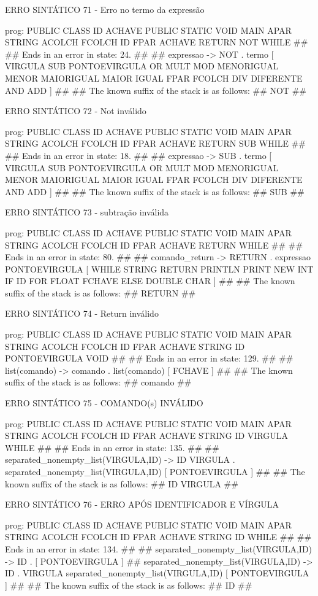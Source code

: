 \documentclass[12pt,a4paper,twoside]{report}
\begin{document}
\begin{terminal}
{ERRO SINTÁTICO 71 - Erro no termo da expressão

prog: PUBLIC CLASS ID ACHAVE PUBLIC STATIC VOID MAIN APAR STRING ACOLCH FCOLCH ID FPAR ACHAVE RETURN NOT WHILE 
##
## Ends in an error in state: 24.
##
## expressao -> NOT . termo [ VIRGULA SUB PONTOEVIRGULA OR MULT MOD MENORIGUAL MENOR MAIORIGUAL MAIOR IGUAL FPAR FCOLCH DIV DIFERENTE AND ADD ]
##
## The known suffix of the stack is as follows:
## NOT 
##

ERRO SINTÁTICO 72 - Not inválido

prog: PUBLIC CLASS ID ACHAVE PUBLIC STATIC VOID MAIN APAR STRING ACOLCH FCOLCH ID FPAR ACHAVE RETURN SUB WHILE 
##
## Ends in an error in state: 18.
##
## expressao -> SUB . termo [ VIRGULA SUB PONTOEVIRGULA OR MULT MOD MENORIGUAL MENOR MAIORIGUAL MAIOR IGUAL FPAR FCOLCH DIV DIFERENTE AND ADD ]
##
## The known suffix of the stack is as follows:
## SUB 
##

ERRO SINTÁTICO 73 - subtração inválida

prog: PUBLIC CLASS ID ACHAVE PUBLIC STATIC VOID MAIN APAR STRING ACOLCH FCOLCH ID FPAR ACHAVE RETURN WHILE 
##
## Ends in an error in state: 80.
##
## comando_return -> RETURN . expressao PONTOEVIRGULA [ WHILE STRING RETURN PRINTLN PRINT NEW INT IF ID FOR FLOAT FCHAVE ELSE DOUBLE CHAR ]
##
## The known suffix of the stack is as follows:
## RETURN 
##

ERRO SINTÁTICO 74 - Return inválido

prog: PUBLIC CLASS ID ACHAVE PUBLIC STATIC VOID MAIN APAR STRING ACOLCH FCOLCH ID FPAR ACHAVE STRING ID PONTOEVIRGULA VOID 
##
## Ends in an error in state: 129.
##
## list(comando) -> comando . list(comando) [ FCHAVE ]
##
## The known suffix of the stack is as follows:
## comando 
##

ERRO SINTÁTICO 75 - COMANDO(s) INVÁLIDO 

prog: PUBLIC CLASS ID ACHAVE PUBLIC STATIC VOID MAIN APAR STRING ACOLCH FCOLCH ID FPAR ACHAVE STRING ID VIRGULA WHILE 
##
## Ends in an error in state: 135.
##
## separated_nonempty_list(VIRGULA,ID) -> ID VIRGULA . separated_nonempty_list(VIRGULA,ID) [ PONTOEVIRGULA ]
##
## The known suffix of the stack is as follows:
## ID VIRGULA 
##

ERRO SINTÁTICO 76 - ERRO APÓS IDENTIFICADOR E VÍRGULA

prog: PUBLIC CLASS ID ACHAVE PUBLIC STATIC VOID MAIN APAR STRING ACOLCH FCOLCH ID FPAR ACHAVE STRING ID WHILE 
##
## Ends in an error in state: 134.
##
## separated_nonempty_list(VIRGULA,ID) -> ID . [ PONTOEVIRGULA ]
## separated_nonempty_list(VIRGULA,ID) -> ID . VIRGULA separated_nonempty_list(VIRGULA,ID) [ PONTOEVIRGULA ]
##
## The known suffix of the stack is as follows:
## ID 
##

}
\end{terminal}
\end{document}
